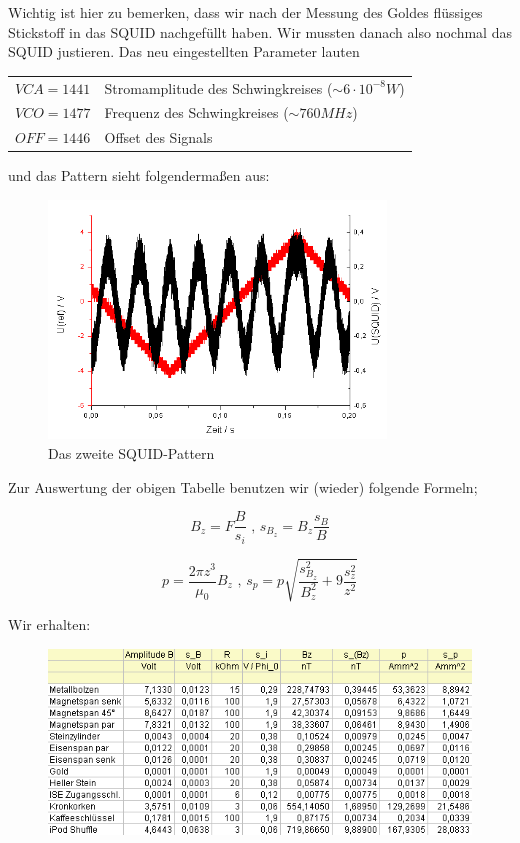 Wichtig ist hier zu bemerken, dass wir nach der Messung des Goldes flüssiges Stickstoff in das SQUID nachgefüllt haben. Wir mussten danach also nochmal das SQUID justieren. Das neu eingestellten Parameter lauten

\begin{center}
\begin{tabular}[H]{l l}
	$VCA = 1441$ & Stromamplitude des Schwingkreises ($\sim 6\cdot 10^{-8} W$)\\
	$VCO = 1477$ & Frequenz des Schwingkreises ($\sim 760 MHz$)\\
	$OFF = 1446$  & Offset des Signals
\end{tabular}
\end{center}

und das Pattern sieht folgendermaßen aus:

\begin{figure}[H]
	\centering \includegraphics[width = 0.8\textwidth]{Bilder/Pattern2.png}
	\caption{Das zweite SQUID-Pattern}
\end{figure}


Zur Auswertung der obigen Tabelle benutzen wir (wieder) folgende Formeln;

$$ B_z = F\frac{B}{s_i} \text{ \ \ , \ \ } s_{B_z} = B_z\frac{s_B}{B}$$

$$ p = \frac{2\pi z^3}{\mu_0}B_z \text{ \ \ , \ \ } s_p = p\sqrt{\frac{s_{B_z}^2}{B_z^2} + 9\frac{s_z^2}{z^2}} $$

Wir erhalten:

\begin{figure}[H]
	\centering \includegraphics[width=\textwidth]{Bilder/Tab-Proben.png}
\end{figure}

